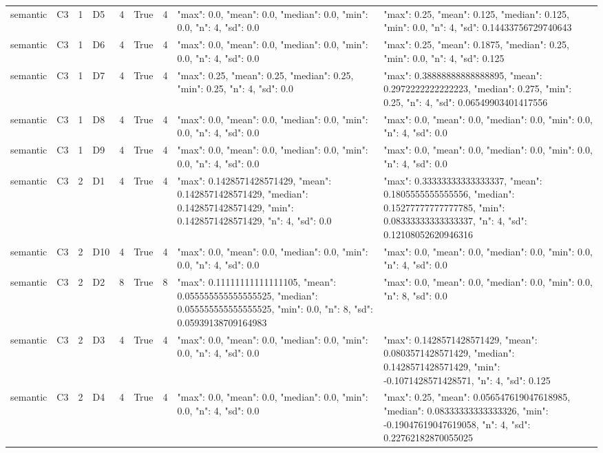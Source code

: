 \begin{tabular}{lllllllll}
semantic & C3 & 1 & D5 & 4 & True & 4 & {"max": 0.0, "mean": 0.0, "median": 0.0, "min": 0.0, "n": 4, "sd": 0.0} & {"max": 0.25, "mean": 0.125, "median": 0.125, "min": 0.0, "n": 4, "sd": 0.14433756729740643} \\
semantic & C3 & 1 & D6 & 4 & True & 4 & {"max": 0.0, "mean": 0.0, "median": 0.0, "min": 0.0, "n": 4, "sd": 0.0} & {"max": 0.25, "mean": 0.1875, "median": 0.25, "min": 0.0, "n": 4, "sd": 0.125} \\
semantic & C3 & 1 & D7 & 4 & True & 4 & {"max": 0.25, "mean": 0.25, "median": 0.25, "min": 0.25, "n": 4, "sd": 0.0} & {"max": 0.38888888888888895, "mean": 0.2972222222222223, "median": 0.275, "min": 0.25, "n": 4, "sd": 0.06549903401417556} \\
semantic & C3 & 1 & D8 & 4 & True & 4 & {"max": 0.0, "mean": 0.0, "median": 0.0, "min": 0.0, "n": 4, "sd": 0.0} & {"max": 0.0, "mean": 0.0, "median": 0.0, "min": 0.0, "n": 4, "sd": 0.0} \\
semantic & C3 & 1 & D9 & 4 & True & 4 & {"max": 0.0, "mean": 0.0, "median": 0.0, "min": 0.0, "n": 4, "sd": 0.0} & {"max": 0.0, "mean": 0.0, "median": 0.0, "min": 0.0, "n": 4, "sd": 0.0} \\
semantic & C3 & 2 & D1 & 4 & True & 4 & {"max": 0.1428571428571429, "mean": 0.1428571428571429, "median": 0.1428571428571429, "min": 0.1428571428571429, "n": 4, "sd": 0.0} & {"max": 0.33333333333333337, "mean": 0.1805555555555556, "median": 0.15277777777777785, "min": 0.08333333333333337, "n": 4, "sd": 0.12108052620946316} \\
semantic & C3 & 2 & D10 & 4 & True & 4 & {"max": 0.0, "mean": 0.0, "median": 0.0, "min": 0.0, "n": 4, "sd": 0.0} & {"max": 0.0, "mean": 0.0, "median": 0.0, "min": 0.0, "n": 4, "sd": 0.0} \\
semantic & C3 & 2 & D2 & 8 & True & 8 & {"max": 0.11111111111111105, "mean": 0.055555555555555525, "median": 0.055555555555555525, "min": 0.0, "n": 8, "sd": 0.05939138709164983} & {"max": 0.0, "mean": 0.0, "median": 0.0, "min": 0.0, "n": 8, "sd": 0.0} \\
semantic & C3 & 2 & D3 & 4 & True & 4 & {"max": 0.0, "mean": 0.0, "median": 0.0, "min": 0.0, "n": 4, "sd": 0.0} & {"max": 0.1428571428571429, "mean": 0.0803571428571429, "median": 0.1428571428571429, "min": -0.1071428571428571, "n": 4, "sd": 0.125} \\
semantic & C3 & 2 & D4 & 4 & True & 4 & {"max": 0.0, "mean": 0.0, "median": 0.0, "min": 0.0, "n": 4, "sd": 0.0} & {"max": 0.25, "mean": 0.056547619047618985, "median": 0.08333333333333326, "min": -0.19047619047619058, "n": 4, "sd": 0.22762182870055025} \\

\end{tabular}
